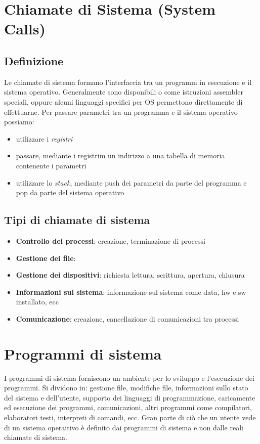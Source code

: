 \documentclass{article}
\begin{document}
\section{Chiamate di Sistema (System Calls)}
\subsection{Definizione}
Le chiamate di sistema formano l'interfaccia tra un programm in esecuzione e il sistema operativo. Generalmente sono disponibili o come 
istruzioni assembler speciali, oppure alcuni linguaggi specifici per OS permettono direttamente di effettuarne.
Per passare parametri tra un programma e il sistema operativo possiamo:
\begin{itemize}
    \item utilizzare i \textit{registri}
    \item passare, mediante i registrim un indirizzo a una tabella di memoria contenente i parametri
    \item utilizzare lo \textit{stack}, mediante push dei parametri da parte del programma e pop da parte del sistema operativo
\end{itemize}
\subsection{Tipi di chiamate di sistema}
\begin{itemize}
    \item \textbf{Controllo dei processi}: creazione, terminazione di processi
    \item \textbf{Gestione dei file}: 
    \item \textbf{Gestione dei dispositivi}: richiesta lettura, scrittura, apertura, chiusura
    \item \textbf{Informazioni sul sistema}: informazione sul sistema come data, hw e sw installato, ecc
    \item \textbf{Comunicazione}: creazione, cancellazione di comunicazioni tra processi
\end{itemize}

\section{Programmi di sistema}
I programmi di sistema forniscono un ambiente per lo sviluppo e l'esecuzione dei programmi. Si dividono in: gestione file, modifiche file,
informazioni sullo stato del sistema e dell'utente, supporto dei linguaggi di programmazione, caricamente ed esecuzione dei programmi, 
comunicazioni, altri programmi come compilatori, elaboratori testi, interpreti di comandi, ecc.
\newline
Gran parte di ciò che un utente vede di un sistema operaitivo è definito dai programmi di sistema e non dalle reali chiamate di sistema.
\end{document}

